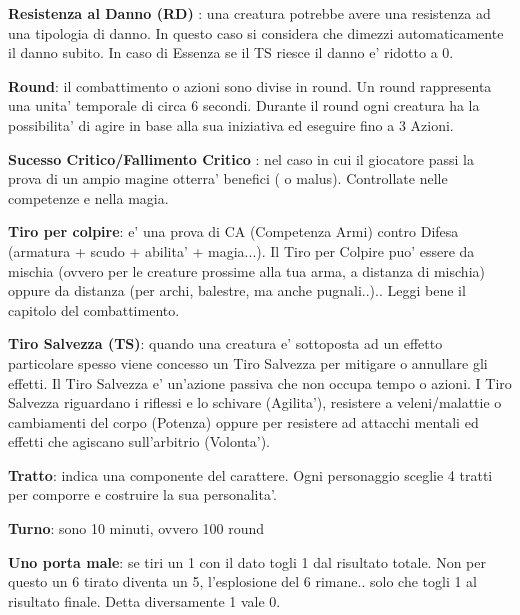 \documentclass[a4paper,11pt,twoside,openany]{book}
\begin{document}
	\textbf{Resistenza al Danno (RD)}  : una creatura potrebbe avere una resistenza ad una tipologia di danno. In questo caso si considera che dimezzi automaticamente il danno subito.
	In caso di Essenza se il TS riesce il danno e' ridotto a 0.
	
	\textbf{Round}: il combattimento o azioni sono divise in round. Un round rappresenta una unita' temporale di circa 6 secondi. Durante il round ogni creatura ha la possibilita' di agire in base alla sua iniziativa ed eseguire fino a 3 Azioni.
	
	\textbf{Sucesso Critico/Fallimento Critico} : nel caso in cui il giocatore passi la prova di un ampio magine otterra' benefici ( o malus). Controllate nelle competenze e nella magia.
	
	\textbf{Tiro per colpire}: e' una prova di CA (Competenza Armi) contro Difesa (armatura + scudo + abilita' + magia...). Il Tiro per Colpire puo' essere da mischia (ovvero per le creature prossime alla tua arma, a distanza di mischia) oppure da distanza (per archi, balestre, ma anche pugnali..).. Leggi bene il capitolo del combattimento.
	
	\textbf{Tiro Salvezza (TS)}: quando una creatura e' sottoposta ad un effetto particolare spesso viene concesso un Tiro Salvezza per mitigare o annullare gli effetti. Il Tiro Salvezza e' un'azione passiva che non occupa tempo o azioni. 
	I Tiro Salvezza riguardano i riflessi e lo schivare (Agilita'), resistere a veleni/malattie o cambiamenti del corpo (Potenza) oppure per resistere ad attacchi mentali ed effetti che agiscano sull'arbitrio (Volonta').
	
	\textbf{Tratto}: indica una componente del carattere. Ogni personaggio sceglie 4 tratti per comporre e costruire la sua personalita'.
	
	\textbf{Turno}: sono 10 minuti, ovvero 100 round
	
	\textbf{Uno porta male}: se tiri un 1 con il dato togli 1 dal risultato totale. Non per questo un 6 tirato diventa un 5, l’esplosione del 6 rimane.. solo che togli 1 al risultato finale. Detta diversamente 1 vale 0.
	
	
	
\end{document}
